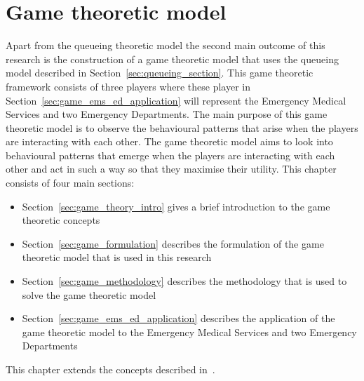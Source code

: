 \chapter{Game theoretic model}\label{sec:game_theoretic_model}

Apart from the queueing theoretic model the second main outcome of this research
is the construction of a game theoretic model that uses the queueing model
described in Section~\ref{sec:queueing_section}.
This game theoretic framework consists of three players where these player in
Section~\ref{sec:game_ems_ed_application} will represent the Emergency Medical
Services and two Emergency Departments.
The main purpose of this game theoretic model is to observe the behavioural
patterns that arise when the players are interacting with each other.
The game theoretic model aims to look into behavioural patterns that emerge
when the players are interacting with each other and act in such a way so that
they maximise their utility. 
This chapter consists of four main sections:

\begin{itemize}
    \item Section~\ref{sec:game_theory_intro} gives a brief introduction to
    the game theoretic concepts
    \item Section~\ref{sec:game_formulation} describes the formulation of the
    game theoretic model that is used in this research
    \item Section~\ref{sec:game_methodology} describes the methodology that is
    used to solve the game theoretic model
    \item Section~\ref{sec:game_ems_ed_application} describes the application
    of the game theoretic model to the Emergency Medical Services and two
    Emergency Departments
\end{itemize}

This chapter extends the concepts described in~\cite{panayides2023game}.









